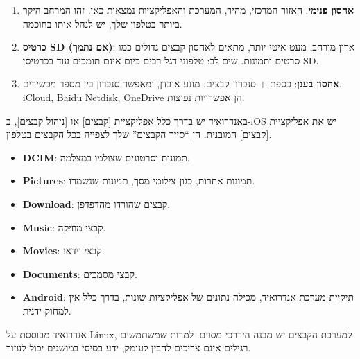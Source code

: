 


\begin{enumerate}
  \item \textbf{אחסון פנימי}: האזור המרכזי, מהיר, המערכת והאפליקציות נמצאות כאן. זהו המרחב היקר ביותר בטלפון שלך, יש לנהל אותו בחוכמה.
  \item \textbf{כרטיס SD (אם נתמך)}: ארון מורחב, מעט איטי יותר, מתאים לאחסון קבצים גדולים כמו סרטים ותמונות. שים לב: טלפוני דגל רבים כיום אינם תומכים עוד בכרטיסי SD.
  \item \textbf{אחסון בענן}: כספת + סנכרון קבצים. מונע אובדן, ומאפשר סנכרון בין מספר מכשירים. iCloud, Baidu Netdisk, OneDrive הן אפשרויות נפוצות.
\end{enumerate}


באנדרואיד יש בדרך כלל אפליקציית [קבצים] או [ניהול קבצים], ב-iOS יש את אפליקציית [קבצים] המובנית. הן “סייר הקבצים” שלך לצפייה בכל הקבצים בטלפון.


\begin{itemize}
  \item \textbf{DCIM}: תמונות וסרטונים שצולמו במצלמה.
  \item \textbf{Pictures}: תמונות אחרות, כגון צילומי מסך, תמונות שנשמרו.
  \item \textbf{Download}: קבצים שהורדו מהדפדפן.
  \item \textbf{Music}: קבצי מוזיקה.
  \item \textbf{Movies}: קבצי וידאו.
  \item \textbf{Documents}: קבצי מסמכים.
  \item \textbf{Android}: תיקיית מערכת אנדרואיד, מכילה נתונים של אפליקציות שונות, בדרך כלל אין למחוק ידנית.
\end{itemize}


אנדרואיד מבוססת על Linux, למערכת הקבצים יש מבנה היררכי מסוים. למרות שמשתמשים רגילים אינם צריכים להבין לעומק, ידע בסיסי במושגים יכול לעזור.

